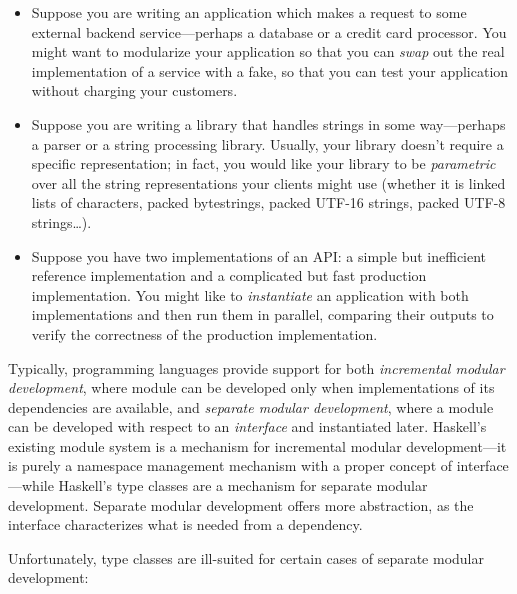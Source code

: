 \begin{itemize}
    \item Suppose you are writing an application which makes a request to
    some external backend service---perhaps a database or a credit card
    processor.  You might want to modularize your
    application so that you can \emph{swap} out the real implementation
    of a service with a fake, so that you can test your application without
    charging your customers.

    \item Suppose you are writing a library that handles strings in some
    way---perhaps a parser or a string processing library.  Usually, your
    library doesn't require a specific representation; in fact, you would
    like your library to be \emph{parametric} over all the string representations
    your clients might use (whether it is linked lists of
    characters, packed bytestrings, packed UTF-16 strings, packed UTF-8
    strings\ldots).

    \item Suppose you have two implementations of an API\@: a simple but
    inefficient reference implementation and a complicated but
    fast production implementation.  You might like to \emph{instantiate}
    an application with both implementations and then run them in
    parallel, comparing their outputs to verify the correctness of the
    production implementation.
\end{itemize}
%
Typically, programming languages provide support for both \emph{incremental
modular development}, where module can be developed only when implementations
of its dependencies are available, and \emph{separate modular development},
where a module can be developed with respect to an \emph{interface}
and instantiated later.  Haskell's existing module system is a mechanism
for incremental modular development---it is purely a namespace management
mechanism with a proper concept of interface---while Haskell's type classes are a
mechanism for separate modular development.  Separate modular development
offers more abstraction, as the interface characterizes
what is needed from a dependency.

Unfortunately, type classes are ill-suited for certain cases of
separate modular development:

